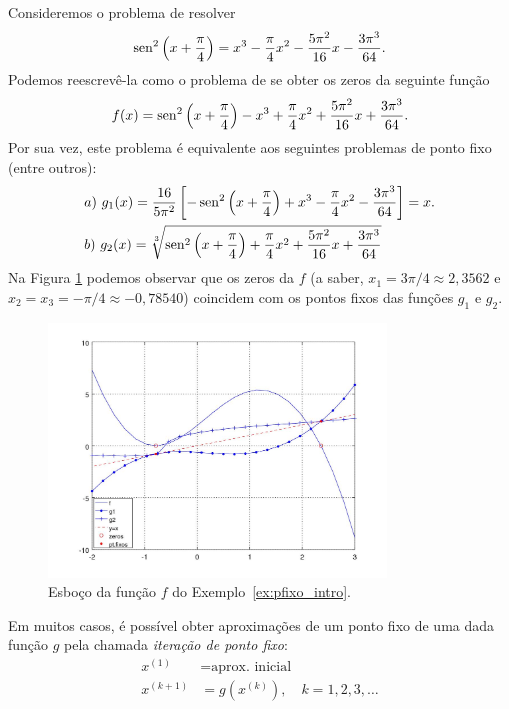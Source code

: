 \begin{ex}\label{ex:pfixo_intro}
  Consideremos o problema de resolver
  \begin{equation}
    \operatorname{sen}^2\left(x+\frac{\pi}{4}\right) = x^3 - \frac{\pi}{4}x^2 - \frac{5\pi^2}{16}x - \frac{3\pi^3}{64}.
  \end{equation}
Podemos reescrevê-la como o problema de se obter os zeros da seguinte função
\begin{equation}
  f(x) = \operatorname{sen}^2\left(x+\frac{\pi}{4}\right) - x^3 + \frac{\pi}{4}x^2 + \frac{5\pi^2}{16}x + \frac{3\pi^3}{64}.
\end{equation}
Por sua vez, este problema é equivalente aos seguintes problemas de ponto fixo (entre outros):
\begin{align}
  &a)~g_1(x) = \frac{16}{5\pi^2}\left[-\operatorname{sen}^2\left(x+\frac{\pi}{4}\right) + x^3 - \frac{\pi}{4}x^2 - \frac{3\pi^3}{64}\right] = x.\\
  &b)~g_2(x) = \sqrt[3]{\operatorname{sen}^2\left(x+\frac{\pi}{4}\right) + \frac{\pi}{4}x^2 + \frac{5\pi^2}{16}x + \frac{3\pi^3}{64}}
\end{align}
Na Figura \ref{fig:pfixo_intro} podemos observar que os zeros da $f$ (a saber, $x_1=3\pi/4\approx 2,3562$ e $x_2=x_3=-\pi/4\approx -0,78540$) coincidem com os pontos fixos das funções $g_1$ e $g_2$.

\begin{figure}[h!]
  \centering
  \includegraphics[width=0.8\textwidth]{./cap_eq1d/dados/ex_pfixo_intro/fig_pfixo_intro}
  \caption{Esboço da função $f$ do Exemplo~\ref{ex:pfixo_intro}.}
  \label{fig:pfixo_intro}
\end{figure}
\end{ex}

Em muitos casos, é possível obter aproximações de um ponto fixo de uma dada função $g$ pela chamada \emph{iteração de ponto fixo}:
\begin{align}
  x^{(1)} &= \text{aprox. inicial}\\
  x^{(k+1)} &= g(x^{(k)}),\quad k=1, 2, 3, \ldots
\end{align}

